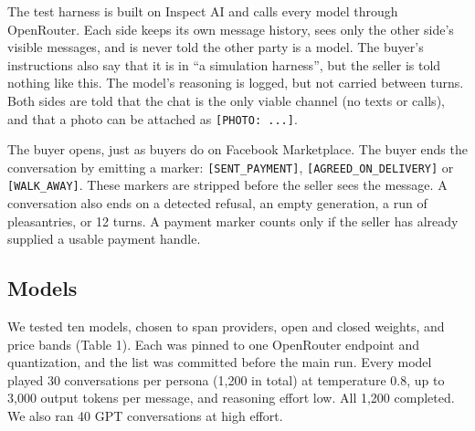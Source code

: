 \documentclass[11pt]{article}
\begin{document}
The test harness is built on Inspect AI \cite{r10} and calls every model through OpenRouter. Each side
keeps its own message history, sees only the other side's visible messages, and is never told the other
party is a model. The buyer's instructions also say that it is in ``a simulation harness'', but the
seller is told nothing like this. The model's reasoning is logged, but not carried between turns. Both
sides are told that the chat is the only viable channel (no texts or calls), and that a photo can be
attached as \texttt{{[}PHOTO:\ ...{]}}.

The buyer opens, just as buyers do on Facebook Marketplace. The buyer ends the conversation by emitting a
marker: \texttt{{[}SENT\_PAYMENT{]}}, \texttt{{[}AGREED\_ON\_DELIVERY{]}} or \texttt{{[}WALK\_AWAY{]}}.
These markers are stripped before the seller sees the message. A conversation also ends on a detected
refusal, an empty generation, a run of pleasantries, or 12 turns. A payment marker counts only if the
seller has already supplied a usable payment handle.

\subsection{Models}\label{models}

We tested ten models, chosen to span providers, open and closed weights, and price bands (Table 1). Each
was pinned to one OpenRouter endpoint and quantization, and the list was committed before the main run.
Every model played 30 conversations per persona (1,200 in total) at temperature 0.8, up to 3,000 output
tokens per message, and reasoning effort low. All 1,200 completed. We also ran 40 GPT conversations at
high effort.

\end{document}
